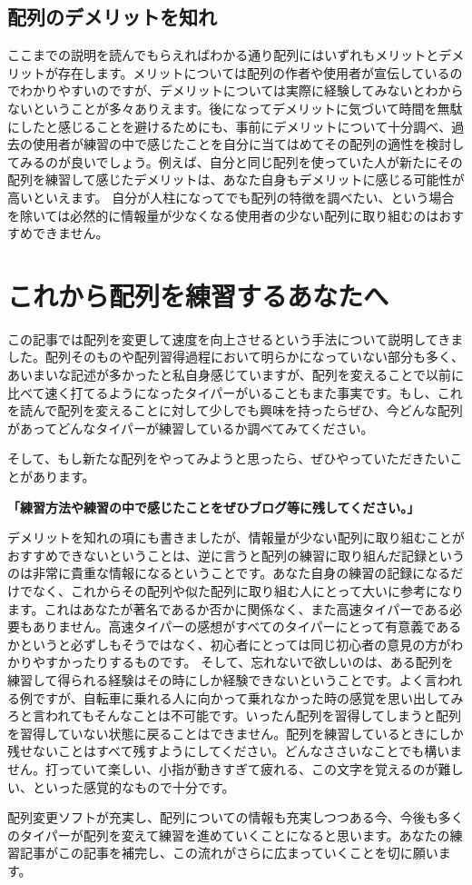 \subsection{配列のデメリットを知れ}

ここまでの説明を読んでもらえればわかる通り配列にはいずれもメリットとデメリットが存在します。メリットについては配列の作者や使用者が宣伝しているのでわかりやすいのですが、デメリットについては実際に経験してみないとわからないということが多々ありえます。後になってデメリットに気づいて時間を無駄にしたと感じることを避けるためにも、事前にデメリットについて十分調べ、過去の使用者が練習の中で感じたことを自分に当てはめてその配列の適性を検討してみるのが良いでしょう。例えば、自分と同じ配列を使っていた人が新たにその配列を練習して感じたデメリットは、あなた自身もデメリットに感じる可能性が高いといえます。
自分が人柱になってでも配列の特徴を調べたい、という場合を除いては必然的に情報量が少なくなる使用者の少ない配列に取り組むのはおすすめできません。


\section{これから配列を練習するあなたへ}

この記事では配列を変更して速度を向上させるという手法について説明してきました。配列そのものや配列習得過程において明らかになっていない部分も多く、あいまいな記述が多かったと私自身感じていますが、配列を変えることで以前に比べて速く打てるようになったタイパーがいることもまた事実です。もし、これを読んで配列を変えることに対して少しでも興味を持ったらぜひ、今どんな配列があってどんなタイパーが練習しているか調べてみてください。

そして、もし新たな配列をやってみようと思ったら、ぜひやっていただきたいことがあります。

\noindent \textbf{「練習方法や練習の中で感じたことをぜひブログ等に残してください。」}

\noindent デメリットを知れの項にも書きましたが、情報量が少ない配列に取り組むことがおすすめできないということは、逆に言うと配列の練習に取り組んだ記録というのは非常に貴重な情報になるということです。あなた自身の練習の記録になるだけでなく、これからその配列や似た配列に取り組む人にとって大いに参考になります。これはあなたが著名であるか否かに関係なく、また高速タイパーである必要もありません。高速タイパーの感想がすべてのタイパーにとって有意義であるかというと必ずしもそうではなく、初心者にとっては同じ初心者の意見の方がわかりやすかったりするものです。
そして、忘れないで欲しいのは、ある配列を練習して得られる経験はその時にしか経験できないということです。よく言われる例ですが、自転車に乗れる人に向かって乗れなかった時の感覚を思い出してみろと言われてもそんなことは不可能です。いったん配列を習得してしまうと配列を習得していない状態に戻ることはできません。配列を練習しているときにしか残せないことはすべて残すようにしてください。どんなささいなことでも構いません。打っていて楽しい、小指が動きすぎて疲れる、この文字を覚えるのが難しい、といった感覚的なもので十分です。

配列変更ソフトが充実し、配列についての情報も充実しつつある今、今後も多くのタイパーが配列を変えて練習を進めていくことになると思います。あなたの練習記事がこの記事を補完し、この流れがさらに広まっていくことを切に願います。

